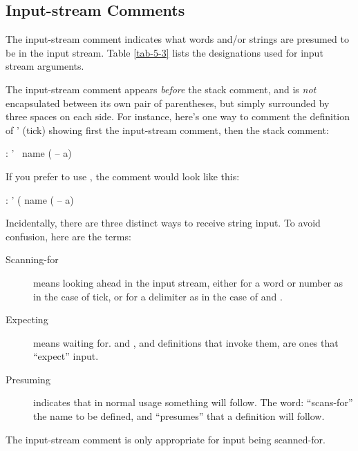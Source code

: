 \subsection{Input-stream Comments}

The input-stream comment indicates what words and/or strings are
presumed to be in the input stream. Table \ref{tab-5-3} lists the
designations used for input stream arguments.

The input-stream comment appears \emph{before} the stack comment, and
is \emph{not} encapsulated between its own pair of parentheses, but
simply surrounded
by three spaces on each side.  For instance, here's one way to comment
the definition of ' (tick) showing first the input-stream comment,
then the stack comment:
\begin{Code}
: '   \ name   ( -- a)
\end{Code}
If you prefer to use \forth{(} , the comment would look like this:
\begin{Code}
: '   ( name   ( -- a)
\end{Code}
Incidentally, there are three distinct ways to receive string input.
To avoid confusion, here are the terms:

\begin{description}
\item[Scanning-for]
means looking ahead in the input stream, either for a word or number
as in the case of tick, or for a delimiter as in the case of
 and \forth{(} .
\item[Expecting]
means waiting for.  and , and definitions
that invoke them, are ones that ``expect'' input.
\item[Presuming]
indicates that in normal usage something will follow.  The word:
``scans-for'' the name to be defined, and ``presumes'' that a
definition will follow.
\end{description}
The input-stream comment is only appropriate for input being scanned-for.


